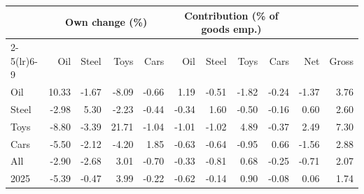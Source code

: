 \begin{tabular}{lrrrrrrrrrr}
\toprule
 & \multicolumn{4}{c}{Own change (\%)} & \multicolumn{4}{c}{Contribution (\% of goods emp.)} & & \\
\cmidrule(lr){2-5}\cmidrule(lr){6-9}
 & Oil & Steel & Toys & Cars & Oil & Steel & Toys & Cars & Net & Gross \\
\midrule
Oil & 10.33 & -1.67 & -8.09 & -0.66 & 1.19 & -0.51 & -1.82 & -0.24 & -1.37 & 3.76 \\
Steel & -2.98 & 5.30 & -2.23 & -0.44 & -0.34 & 1.60 & -0.50 & -0.16 & 0.60 & 2.60 \\
Toys & -8.80 & -3.39 & 21.71 & -1.04 & -1.01 & -1.02 & 4.89 & -0.37 & 2.49 & 7.30 \\
Cars & -5.50 & -2.12 & -4.20 & 1.85 & -0.63 & -0.64 & -0.95 & 0.66 & -1.56 & 2.88 \\
All & -2.90 & -2.68 & 3.01 & -0.70 & -0.33 & -0.81 & 0.68 & -0.25 & -0.71 & 2.07 \\
2025 & -5.39 & -0.47 & 3.99 & -0.22 & -0.62 & -0.14 & 0.90 & -0.08 & 0.06 & 1.74 \\
\bottomrule
\end{tabular}

